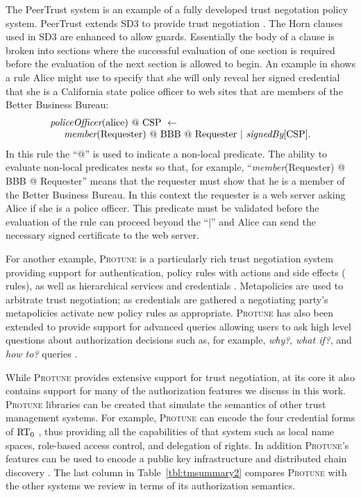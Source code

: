 The PeerTrust system is an example of a fully developed trust
negotation policy system.  PeerTrust extends SD3 to provide trust
negotiation \cite{gavriloaie-eswp04}. The Horn clauses used in SD3 are
enhanced to allow guards. Essentially the body of a clause is broken
into sections where the successful evaluation of one section is
required before the evaluation of the next section is allowed to
begin. An example in \cite{gavriloaie-eswp04} shows a rule Alice might
use to specify that she will only reveal her signed credential that
she is a California state police officer to web sites that are members
of the Better Business Bureau:
\begin{displaymath}
\begin{array}{l}
\textit{policeOfficer}(\textrm{alice})\,\, @\,\, \textrm{CSP}\,\, \leftarrow \\
\hspace{0.5cm} \textit{member}(\textrm{Requester})\,\, @\,\, \textrm{BBB}\,\, @\,\, \textrm{Requester}\,\, |\,\, \textit{signedBy}[\textrm{CSP}].
\end{array}
\end{displaymath}
In this rule the ``@'' is used to indicate a non-local predicate. The
ability to evaluate non-local predicates nests so that, for example,
``\textit{member}(Requester) @ BBB @ Requester'' means that the requester
must show that he is a member of the Better Business Bureau. In this
context the requester is a web server asking Alice if she is a police
officer. This predicate must be validated before the evaluation of the rule
can proceed beyond the ``|'' and Alice can send the necessary signed
certificate to the web server.

For another example, \textsc{Protune} is a particularly rich trust
negotiation system providing support for authentication, policy rules with
actions and side effects ( rules), as well as
hierarchical services and credentials
\cite{bonatti-ccs00,Bonatti:UFRAIRW,Jajodia:FSMACP,protune-05}.
Metapolicies are used to arbitrate trust negotiation; as credentials are
gathered a negotiating party's metapolicies activate new policy rules as
appropriate. \textsc{Protune} has also been extended to provide support for
advanced queries allowing users to ask high level questions about
authorization decisions such as, for example, \textit{why?}, \textit{what
if?}, and \textit{how to?} queries \cite{bonatti-ecai06}.

While \textsc{Protune} provides extensive support for trust negotiation, at
its core it also contains support for many of the authorization features we
discuss in this work. \textsc{Protune} libraries can be created that
simulate the semantics of other trust management systems. For example,
\textsc{Protune} can encode the four credential forms of $\text{RT}_0$
\cite{Bonatti:PLS}, thus providing all the capabilities of that system such
as local name spaces, role-based access control, and delegation of rights.
In addition \textsc{Protune}'s features can be used to encode a public key
infrastructure \cite{bonatti-ccs00,Bonatti:UFRAIRW} and distributed chain
discovery \cite{Bonatti:PLS}. The last column in Table~\ref{tbl:tmsummary2}
compares \textsc{Protune} with the other systems we review in terms of its
authorization semantics.

